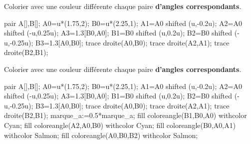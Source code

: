 \begin{exercice*}
    Colorier avec une couleur différente chaque paire \textbf{d'angles correspondants}.
    \par\smallskip
    \begin{center}
        \begin{Geometrie}[CoinHD={(3.5u,3u)}]
            pair A[],B[];
            A0=u*(1.75,2);
            B0=u*(2.25,1);
            A1=A0 shifted (u,-0.2u);
            A2=A0 shifted (-u,0.25u);
            A3=1.3[B0,A0];
            B1=B0 shifted (u,0.2u);
            B2=B0 shifted (-u,-0.25u);
            B3=1.3[A0,B0];
            trace droite(A0,B0);
            trace droite(A2,A1);
            trace droite(B2,B1);
        \end{Geometrie}
    \end{center}
\end{exercice*}
\begin{corrige}
    Colorier avec une couleur différente chaque paire \textbf{d'angles correspondants}.
    \par\smallskip
    \begin{center}
        \begin{Geometrie}[CoinHD={(3.5u,3u)}]
            pair A[],B[];
            A0=u*(1.75,2);
            B0=u*(2.25,1);
            A1=A0 shifted (u,-0.2u);
            A2=A0 shifted (-u,0.25u);
            A3=1.3[B0,A0];
            B1=B0 shifted (u,0.2u);
            B2=B0 shifted (-u,-0.25u);
            B3=1.3[A0,B0];
            trace droite(A0,B0);
            trace droite(A2,A1);
            trace droite(B2,B1);
            marque_a:=0.5*marque_a;
            fill coloreangle(B1,B0,A0) withcolor Cyan;
            fill coloreangle(A2,A0,B0) withcolor Cyan;
            fill coloreangle(B0,A0,A1) withcolor Salmon;
            fill coloreangle(A0,B0,B2) withcolor Salmon;
        \end{Geometrie}
    \end{center}
\end{corrige}